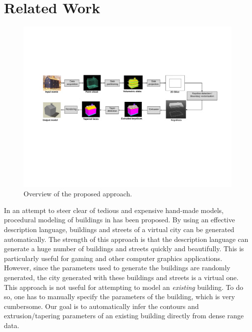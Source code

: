 \documentclass[10pt,twocolumn,letterpaper]{article}
\begin{document}
\section{Related Work}

\begin{figure}[htbp]
\begin{center}
\includegraphics[width=7in]{overview.pdf}
\end{center}
\caption{Overview of the proposed approach.}
\label{fig:ov}
\end{figure}

In an attempt to steer clear of tedious and expensive hand-made models,
procedural modeling of buildings in \cite{PMB_MWH} has been proposed.
By using an effective description language, buildings and streets of a virtual
city can be generated automatically.
The strength of this approach is that the description language can generate
a huge number of buildings and streets quickly and beautifully.
This is particularly useful for gaming and other computer graphics applications.
However, since the parameters used to generate the buildings are randomly
generated, the city generated with these buildings and streets is a virtual one.
This approach is not useful for attempting to model an {\it existing} building.
To do so, one has to manually specify the parameters of the building,
which is very cumbersome.
Our goal is to automatically infer the contours and extrusion/tapering parameters
of an existing building directly from dense range data.
\end{document}
